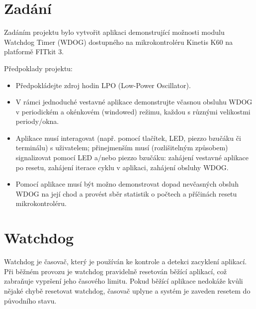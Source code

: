 \documentclass[12pt,a4paper,final]{article}
\begin{document}


\pagestyle{plain}
\setcounter{page}{1}
\tableofcontents


\newpage
\pagestyle{plain}
\setcounter{page}{1}

\section{Zadání}
Zadáním projektu bylo vytvořit aplikaci demonstrující možnosti modulu Watchdog Timer (WDOG) dostupného na mikrokontroléru Kinetis K60 na platformě FITkit 3.

Předpoklady projektu:
\begin{itemize}
    \item Předpokládejte zdroj hodin LPO (Low-Power Oscillator).
    \item V rámci jednoduché vestavné aplikace demonstrujte včasnou obsluhu WDOG v periodickém a okénkovém (windowed) režimu, každou s různými velikostmi periody/okna.
    \item Aplikace musí interagovat (např. pomocí tlačítek, LED, piezzo bzučáku či terminálu) s uživatelem; přinejmenším musí (rozlišitelným způsobem) signalizovat pomocí LED a/nebo piezzo bzučáku: zahájení vestavné aplikace po resetu, zahájení iterace cyklu v aplikaci, zahájení obsluhy WDOG.
    \item Pomocí aplikace musí být možno demonstrovat dopad nevčasných obsluh WDOG na její chod a provést sběr statistik o počtech a příčinách resetu mikrokontroléru.
\end{itemize}

\section{Watchdog}

Watchdog je časovač, který je používán ke kontrole a detekci zacyklení aplikací. Při běžném provozu je watchdog pravidelně resetován běžící aplikací, což zabraňuje vypršení jeho časového limitu. Pokud běžící aplikace nedokáže kvůli nějaké chybě resetovat watchdog, časovač uplyne a systém je zaveden resetem do původního stavu.
\end{document}
